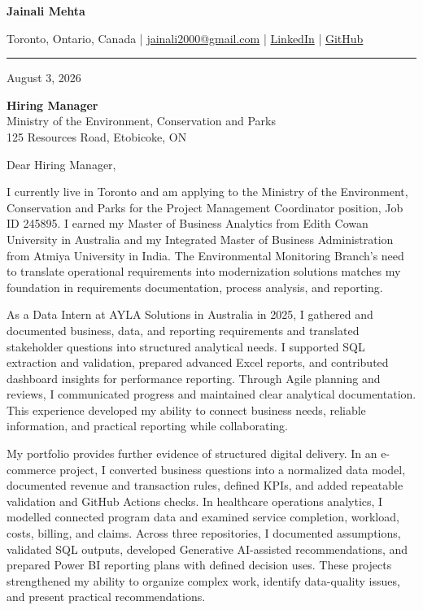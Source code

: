 \documentclass[letterpaper,10pt]{article}
\begin{document}
\begin{center}
  {\fontsize{17}{19}\selectfont\textbf{Jainali Mehta}}\par\vspace{2pt}
  \small Toronto, Ontario, Canada \;|\;
  \href{mailto:jainali2000@gmail.com}{jainali2000@gmail.com} \;|\;
  \href{https://www.linkedin.com/in/jainali-mehta}{LinkedIn} \;|\;
  \href{https://github.com/jainalimehta}{GitHub}
\end{center}
\vspace{-5pt}
\noindent\rule{\textwidth}{0.4pt}

August 3, 2026

\textbf{Hiring Manager}\\
Ministry of the Environment, Conservation and Parks\\
125 Resources Road, Etobicoke, ON

Dear Hiring Manager,

I currently live in Toronto and am applying to the Ministry of the Environment, Conservation and Parks for the Project Management Coordinator position, Job ID 245895. I earned my Master of Business Analytics from Edith Cowan University in Australia and my Integrated Master of Business Administration from Atmiya University in India. The Environmental Monitoring Branch's need to translate operational requirements into modernization solutions matches my foundation in requirements documentation, process analysis, and reporting.

As a Data Intern at AYLA Solutions in Australia in 2025, I gathered and documented business, data, and reporting requirements and translated stakeholder questions into structured analytical needs. I supported SQL extraction and validation, prepared advanced Excel reports, and contributed dashboard insights for performance reporting. Through Agile planning and reviews, I communicated progress and maintained clear analytical documentation. This experience developed my ability to connect business needs, reliable information, and practical reporting while collaborating.

My portfolio provides further evidence of structured digital delivery. In an e-commerce project, I converted business questions into a normalized data model, documented revenue and transaction rules, defined KPIs, and added repeatable validation and GitHub Actions checks. In healthcare operations analytics, I modelled connected program data and examined service completion, workload, costs, billing, and claims. Across three repositories, I documented assumptions, validated SQL outputs, developed Generative AI-assisted recommendations, and prepared Power BI reporting plans with defined decision uses. These projects strengthened my ability to organize complex work, identify data-quality issues, and present practical recommendations.
\end{document}
